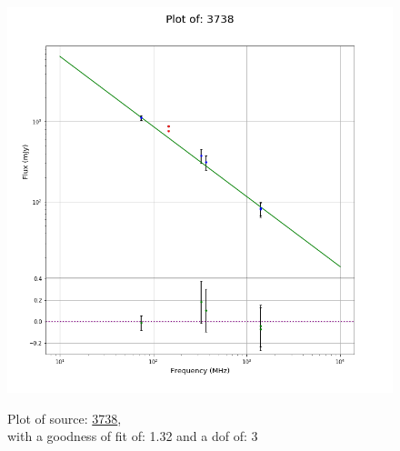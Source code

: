 \documentclass{article}
\begin{document}
\begin{figure}[H]
\begin{minipage}{0.5\textwidth}
        \includegraphics[scale = 0.35]{KmeulenSimSource_1hr/1hr3738.png}
        \captionsetup{labelformat=empty}
        \caption{Plot of source: \href{http://banana.transientskp.org/r4/vlo_KmeulenSimSource/runningcatalog/3738}{3738},\\with a goodness of fit of: 1.32 and a dof of: 3}
    \addtocounter{figure}{-1}
    \label{KmeulenSimSource:1hr:3738:plot}
    \end{minipage}
\end{figure}
\end{document}
